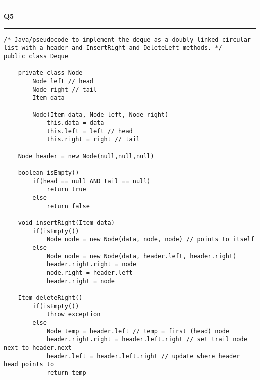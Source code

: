 \documentclass[11pt]{article}
\newcommand\question[2]{\vspace{.25in}\hrule\textbf{#1 #2}\vspace{.5em}\hrule\vspace{.10in}}
\begin{document}
\question{Q5}{}
\begin{lstlisting}
/* Java/pseudocode to implement the deque as a doubly-linked circular list with a header and InsertRight and DeleteLeft methods. */
public class Deque
	
	private class Node
		Node left // head
		Node right // tail
		Item data

		Node(Item data, Node left, Node right)
			this.data = data
			this.left = left // head
			this.right = right // tail

	Node header = new Node(null,null,null)
	
	boolean isEmpty()
		if(head == null AND tail == null)
			return true
		else 
			return false

	void insertRight(Item data)
		if(isEmpty())
			Node node = new Node(data, node, node) // points to itself
		else
			Node node = new Node(data, header.left, header.right)
			header.right.right = node
			node.right = header.left
			header.right = node

	Item deleteRight()
		if(isEmpty())
			throw exception
		else
			Node temp = header.left // temp = first (head) node
			header.right.right = header.left.right // set trail node next to header.next
			header.left = header.left.right // update where header head points to
			return temp	
\end{lstlisting}
\end{document}
